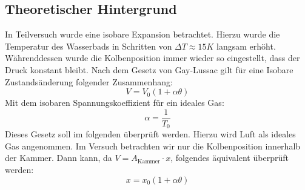 \documentclass{report}
\begin{document}
\subsection{Theoretischer Hintergrund}
In Teilversuch wurde eine isobare Expansion betrachtet. Hierzu wurde die Temperatur des Wasserbads in Schritten von $\Delta T \approx 15K$ langsam erhöht. 
Währenddessen wurde die Kolbenposition immer wieder so eingestellt, dass der Druck konstant bleibt. Nach dem Gesetz von Gay-Lussac gilt für eine Isobare Zustandsänderung
folgender Zusammenhang:
\begin{equation}
    V = V_{0}(1 + \alpha \theta)
\end{equation}
Mit dem isobaren Spannungskoeffizient für ein ideales Gas:
\begin{equation}
    \alpha = \frac{1}{T_0}
\end{equation}
Dieses Gesetz soll im folgenden überprüft werden. Hierzu wird Luft als ideales Gas angenommen.
Im Versuch betrachten wir nur die Kolbenposition innerhalb der Kammer. Dann kann, da $V = A_{\mathrm{Kammer}} \cdot x$, folgendes äquivalent überprüft werden:
\begin{equation}
    x = x_0(1 + \alpha \theta)
\end{equation}
\end{document}
